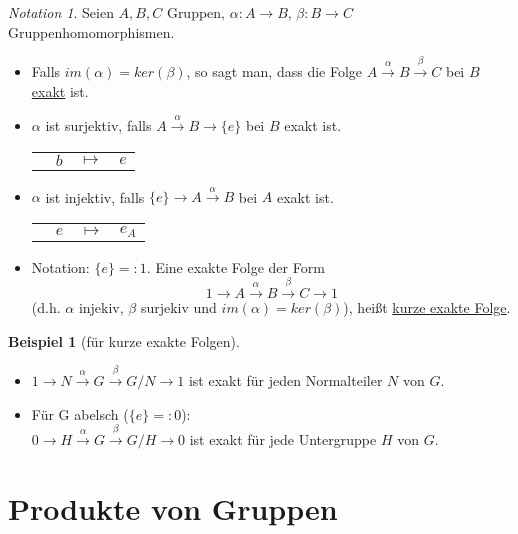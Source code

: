 \documentclass[12pt]{scrartcl}%
\theoremstyle{definition}
\newtheorem{ex}{Beispiel}
\theoremstyle{remark}
\newtheorem*{notation}{Notation}
\begin{document}
\begin{notation}
	Seien $A, B, C$ Gruppen, $\alpha: A \rightarrow B$, $\beta: B \rightarrow C$ Gruppenhomomorphismen.
	\begin{itemize}
		\item Falls $im(\alpha) = ker(\beta)$, so sagt man, dass die Folge $A \stackrel{\alpha}{\longrightarrow} B \stackrel{\beta}{\longrightarrow} C$ bei $B$ \underline{exakt} ist.
		\item $\alpha$ ist surjektiv, falls $A \stackrel{\alpha}{\longrightarrow} B \longrightarrow  \{e\}$ bei $B$ exakt ist. \\
		\begin{tabular}{p{4.3cm}p{.1cm}p{.3cm}l}
			& $b$ & $\mapsto$ & $e$
		\end{tabular}
		\item $\alpha$ ist injektiv, falls $\{e\} \longrightarrow A \stackrel{\alpha}{\longrightarrow} B$ bei $A$ exakt ist. \\
		\begin{tabular}{p{3.1cm}p{.1cm}p{.3cm}l}
			& $e$ & $\mapsto$ & $e_A$
		\end{tabular}
		\item Notation: $\{e\} =: 1$. Eine exakte Folge der Form
		$$ 1 \longrightarrow A \stackrel{\alpha}{\longrightarrow} B \stackrel{\beta}{\longrightarrow} C \longrightarrow 1$$
		(d.h. $\alpha$ injekiv, $\beta$ surjekiv und $im(\alpha) = ker(\beta)$), heißt \underline{kurze exakte Folge}.
	\end{itemize}
\end{notation}

\begin{ex}[für kurze exakte Folgen]
	\begin{itemize}
		\item $1 \longrightarrow N \stackrel{\alpha}{\longrightarrow} G \stackrel{\beta}{\longrightarrow} G/N \longrightarrow 1$ ist exakt für jeden Normalteiler $N$ von $G$.
		\item Für G abelsch ($\{e\} =: 0$): \\
		$0 \longrightarrow H \stackrel{\alpha}{\longrightarrow} G \stackrel{\beta}{\longrightarrow} G/H \longrightarrow 0$ ist exakt für jede Untergruppe $H$ von $G$.
	\end{itemize}
\end{ex}



\section{Produkte von Gruppen}
\end{document}
